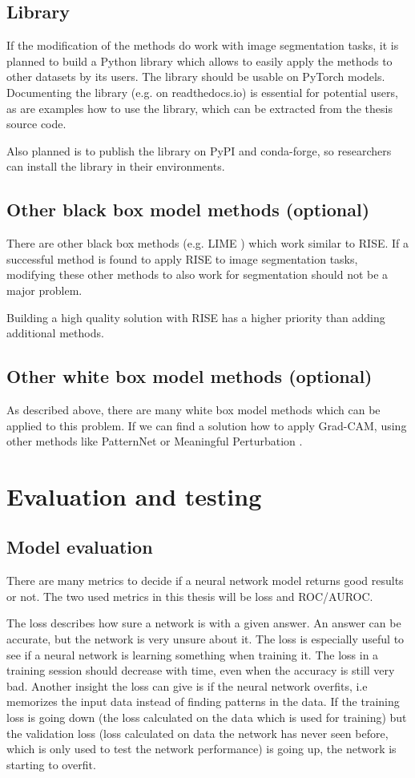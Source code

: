 \section{Library}
If the modification of the methods do work with image segmentation tasks, it is planned to build a Python library which allows to easily apply the methods to other datasets by its users. The library should be usable on PyTorch models. Documenting the library (e.g. on readthedocs.io) is essential for potential users, as are examples how to use the library, which can be extracted from the thesis source code.

Also planned is to publish the library on PyPI and conda-forge, so researchers can install the library in their environments.

\section{Other black box model methods (optional)}
There are other black box methods (e.g. LIME \cite{ribeiro2016should}) which work similar to RISE. If a successful method is found to apply RISE to image segmentation tasks, modifying these other methods to also work for segmentation should not be a major problem.

Building a high quality solution with RISE has a higher priority than adding additional methods.

\section{Other white box model methods (optional)}
As described above, there are many white box model methods which can be applied to this problem. If we can find a solution how to apply Grad-CAM, using other methods like PatternNet \cite{kindermans2017learning} or Meaningful Perturbation \cite{fong2017interpretable}.

\chapter{Evaluation and testing}
\section{Model evaluation}
There are many metrics to decide if a neural network model returns good results or not.
The two used metrics in this thesis will be loss and ROC/AUROC.

The loss describes how sure a network is with a given answer. An answer can be accurate, but the network is very unsure about it. The loss is especially useful to see if a neural network is learning something when training it. The loss in a training session should decrease with time, even when the accuracy is still very bad.
Another insight the loss can give is if the neural network overfits, i.e memorizes the input data instead of finding patterns in the data. If the training loss is going down (the loss calculated on the data which is used for training) but the validation loss (loss calculated on data the network has never seen before, which is only used to test the network performance) is going up, the network is starting to overfit.

